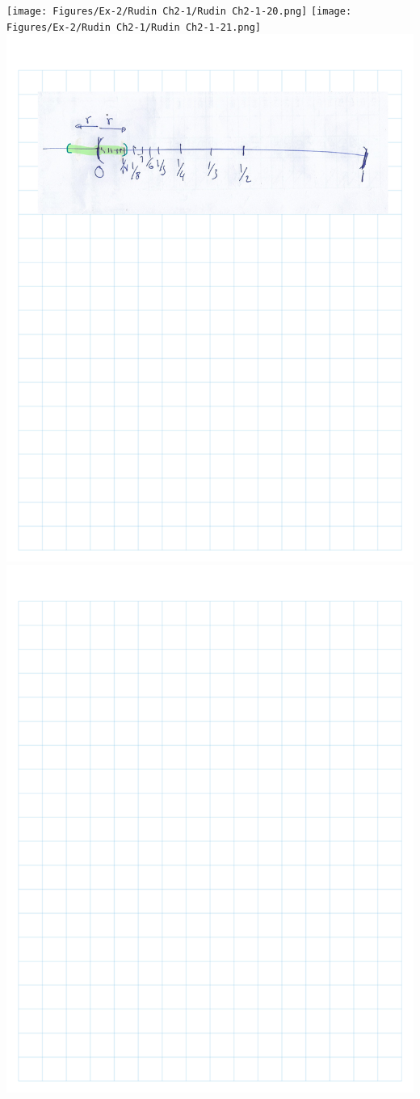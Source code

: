 \documentclass[
]{book}
\theoremstyle{definition}
\theoremstyle{definition}
\theoremstyle{definition}
\theoremstyle{definition}
\theoremstyle{remark}
\begin{document}
\texttt{[image: Figures/Ex-2/Rudin Ch2-1/Rudin Ch2-1-20.png]}
\texttt{[image: Figures/Ex-2/Rudin Ch2-1/Rudin Ch2-1-21.png]}
\includegraphics{Figures/Ex-2/Rudin Ch2-1/Rudin Ch2-1-22.png}
\includegraphics{Figures/Ex-2/Rudin Ch2-1/Rudin Ch2-1-23.png}
\end{document}
